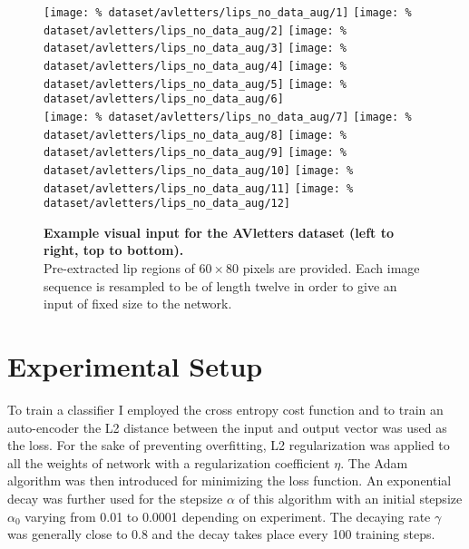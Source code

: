\begin{figure}[H]
  \centering
  \texttt{[image: \%
    dataset/avletters/lips\_no\_data\_aug/1]}
  \texttt{[image: \%
    dataset/avletters/lips\_no\_data\_aug/2]}
  \texttt{[image: \%
    dataset/avletters/lips\_no\_data\_aug/3]}
  \texttt{[image: \%
    dataset/avletters/lips\_no\_data\_aug/4]}
  \texttt{[image: \%
    dataset/avletters/lips\_no\_data\_aug/5]}
  \texttt{[image: \%
    dataset/avletters/lips\_no\_data\_aug/6]}\\[0.15em]
  \texttt{[image: \%
    dataset/avletters/lips\_no\_data\_aug/7]}
  \texttt{[image: \%
    dataset/avletters/lips\_no\_data\_aug/8]}
  \texttt{[image: \%
    dataset/avletters/lips\_no\_data\_aug/9]}
  \texttt{[image: \%
    dataset/avletters/lips\_no\_data\_aug/10]}
  \texttt{[image: \%
    dataset/avletters/lips\_no\_data\_aug/11]}
  \texttt{[image: \%
    dataset/avletters/lips\_no\_data\_aug/12]}
  \caption{%
    \textbf{Example visual input for the AVletters dataset
      (left to right, top to bottom).}\\[0.1em]
    Pre-extracted lip regions of $60 \times 80$ pixels are provided.
      Each image sequence is resampled to be of length twelve in order to
      give an input of fixed size to the network.}
  \label{fig:avletters_exs}
\end{figure}

\section{Experimental Setup} \label{section:exp}

To train a classifier I employed the cross entropy cost function and to
train an auto-encoder the L2 distance between the input and output vector
was used as the loss. For the sake of preventing overfitting, L2
regularization \cite{Y. Bengio 2012} was applied to all the weights of
network with a regularization coefficient $\eta$.
The Adam algorithm \cite{D. Kingma 2014}
was then introduced for minimizing the loss function.
An exponential decay was further used for the stepsize $\alpha$ of this
algorithm with an initial stepsize $\alpha_0$ varying from 0.01 to 0.0001
depending on experiment. The decaying rate $\gamma$
was generally close to 0.8 and
the decay takes place every 100 training steps.

